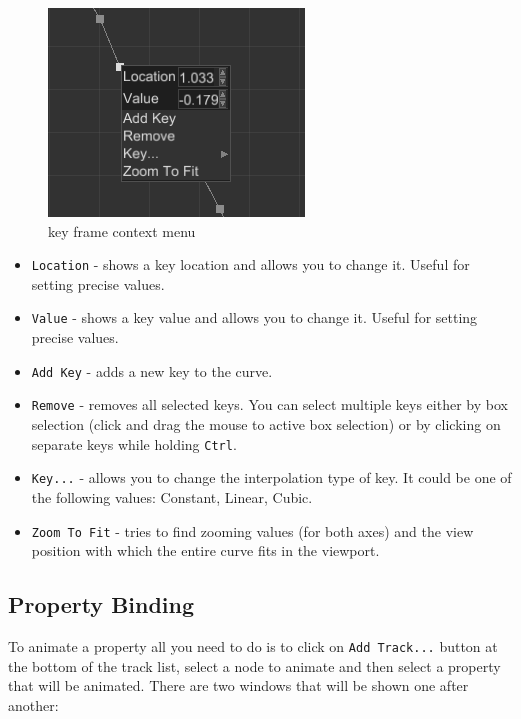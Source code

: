 \documentclass[
]{book}
\providecommand{\tightlist}{%
  \setlength{\itemsep}{0pt}\setlength{\parskip}{0pt}}
\theoremstyle{definition}
\theoremstyle{definition}
\theoremstyle{definition}
\theoremstyle{definition}
\theoremstyle{remark}
\begin{document}
\begin{figure}
\centering
\includegraphics{images/animation/ae_key_frame_context_menu.png}
\caption{key frame context menu}
\end{figure}

\begin{itemize}
\tightlist
\item
  \texttt{Location} - shows a key location and allows you to change it. Useful for setting precise values.
\item
  \texttt{Value} - shows a key value and allows you to change it. Useful for setting precise values.
\item
  \texttt{Add\ Key} - adds a new key to the curve.
\item
  \texttt{Remove} - removes all selected keys. You can select multiple keys either by box selection (click and drag the mouse to active box selection) or by clicking on separate keys while holding \texttt{Ctrl}.
\item
  \texttt{Key...} - allows you to change the interpolation type of key. It could be one of the following values: Constant, Linear, Cubic.
\item
  \texttt{Zoom\ To\ Fit} - tries to find zooming values (for both axes) and the view position with which the entire curve fits in the viewport.
\end{itemize}

\subsection{Property Binding}\label{property-binding}

To animate a property all you need to do is to click on \texttt{Add\ Track...} button at the bottom of the track list, select a node to animate and then select a property that will be animated. There are two windows that will be shown one after another:
\end{document}
